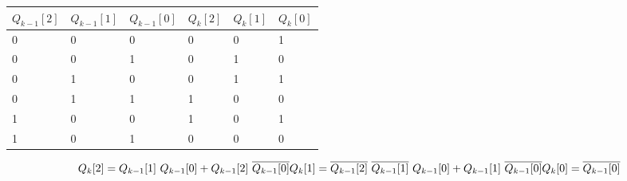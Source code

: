 \documentclass[]{article}
\date{}
\begin{document}
\begin{longtable}[]{@{}llllll@{}}
\toprule
\(Q_{k-1}[2]\) & \(Q_{k-1}[1]\) & \(Q_{k-1}[0]\) & \(Q_k[2]\) &
\(Q_k[1]\) & \(Q_k[0]\)\tabularnewline
\midrule
\endhead
0 & 0 & 0 & 0 & 0 & 1\tabularnewline
0 & 0 & 1 & 0 & 1 & 0\tabularnewline
0 & 1 & 0 & 0 & 1 & 1\tabularnewline
0 & 1 & 1 & 1 & 0 & 0\tabularnewline
1 & 0 & 0 & 1 & 0 & 1\tabularnewline
1 & 0 & 1 & 0 & 0 & 0\tabularnewline
\bottomrule
\end{longtable}

\[Q_k[2] = Q_{k-1}[1]~Q_{k-1}[0]+Q_{k-1}[2] ~\overline{Q_{k-1}[0]}\\

Q_k[1] = \overline{Q_{k-1}[2]} ~\overline{Q_{k-1}[1]}~Q_{k-1}[0]+Q_{k-1}[1]~\overline{Q_{k-1}[0]}\\

Q_k[0] = \overline{Q_{k-1}[0]}\]
\end{document}
